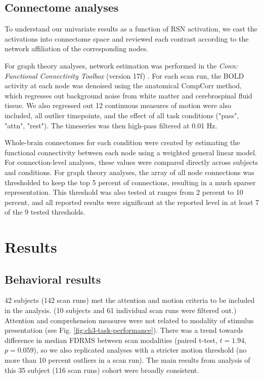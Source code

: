 \subsection{Connectome analyses}

To understand our univariate results as a function of RSN activation, we cast the activations into connectome space and reviewed each contrast according to the network affiliation of the corresponding nodes.

For graph theory analyses, network estimation was performed in the \textit{Conn: Functional Connectivity Toolbox} (version 17f) \citep{WhitfieldGabrieli2012}. For each scan run, the BOLD activity at each node was denoised using the anatomical CompCorr method, which regresses out background noise from white matter and cerebrospinal fluid tissue. We also regressed out 12 continuous measures of motion were also included, all outlier timepoints, and the effect of all task conditions ("pass", "attn", "rest"). The timeseries was then high-pass filtered at 0.01 Hz.

Whole-brain connectomes for each condition were created by estimating the functional connectivity between each node using a weighted general linear model. For connection-level analyses, these values were compared directly across subjects and conditions. For graph theory analyses, the array of all node connections was thresholded to keep the top 5 percent of connections, resulting in a much sparser representation. This threshold was also tested at ranges from 2 percent to 10 percent, and all reported results were significant at the reported level in at least 7 of the 9 tested thresholds.




\section{Results}

\subsection{Behavioral results}

42 subjects (142 scan runs) met the attention and motion criteria to be included in the analysis. (10 subjects and 61 individual scan runs were filtered out.) Attention and comprehension measures were not related to modality of stimulus presentation (see Fig. \ref{fig:ch3-task-performance}). There was a trend towards difference in median FDRMS between scan modalities (paired t-test, $t = 1.94$, $p = 0.059$), so we also replicated analyses with a stricter motion threshold (no more than 10 percent outliers in a scan run). The main results from analysis of this 35 subject (116 scan runs) cohort were broadly consistent.

